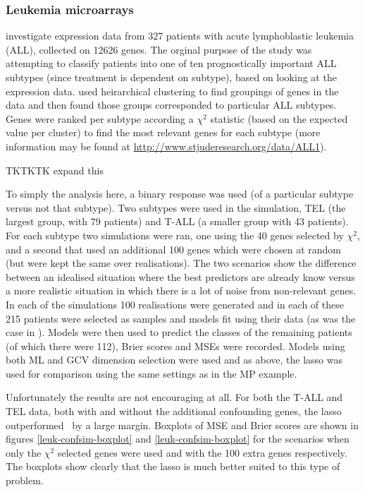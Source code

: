 \subsubsection{Leukemia microarrays}

\cite{yeoh2002} investigate expression data from 327 patients with acute lymphoblastic leukemia (ALL), collected on 12626 genes. The orginal purpose of the study was attempting to classify patients into one of ten prognostically important ALL subtypes (since treatment is dependent on subtype), based on looking at the expression data. \cite{yeoh2002} used heirarchical clustering to find groupings of genes in the data and then found those groups corresponded to particular ALL subtypes. Genes were ranked per subtype according a $\chi^2$ statistic (based on the expected value per cluster) to find the most relevant genes for each subtype (more information may be found at \url{http://www.stjuderesearch.org/data/ALL1}).

TKTKTK expand this

To simply the analysis here, a binary response was used (of a particular subtype versus not that subtype). Two subtypes were used in the simulation, TEL (the largest group, with 79 patients) and T-ALL (a smaller group with 43 patients). For each subtype two simulations were ran, one using the 40 genes selected by $\chi^2$, and a second that used an additional 100 genes which were chosen at random (but were kept the same over realisations). The two scenarios show the difference between an idealised situation where the best predictors are already know versus a more realistic situation in which there is a lot of noise from non-relevant genes. In each of the simulations 100 realisations were generated and in each of these 215 patients were selected as samples and models fit using their data (as was the case in \cite{yeoh2002}). Models were then used to predict the classes of the remaining patients (of which there were 112), Brier scores and MSEs were recorded. Models using both ML and GCV dimension selection were used and as above, the lasso was used for comparison using the same settings as in the MP example. 

Unfortunately the results are not encouraging at all. For both the T-ALL and TEL data, both with and without the additional confounding genes, the lasso outperformed \mdsds\ by a large margin. Boxplots of MSE and Brier scores are shown in figures \ref{leuk-confsim-boxplot} and \ref{leuk-confsim-boxplot} for the scenarios when only the $\chi^2$ selected genes were used and with the 100 extra genes respectively. The boxplots show clearly that the lasso is much better suited to this type of problem.

